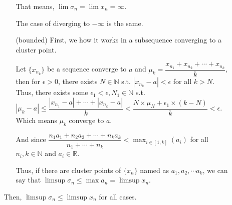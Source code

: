 \documentclass[12pt]{article}
\begin{document}
\begin{enumerate}
\begin{enumerate}[(a)]
\begin{enumerate}
            That means, $\lim \sigma_n = \lim x_n = \infty$.

            The case of diverging to $-\infty$ is the same.

            \item[(bounded)] First, we how it works in a subsequence converging to a cluster point.
            
            Let $\lbrace x_{n_k}\rbrace$ be a sequence converge to $a$ and $\mu_{k} = \dfrac{x_{n_1} + x_{n_2} + \cdots + x_{n_k}}{k}$, then for $\epsilon > 0$, there exists $N\in \mathbb{N}$ s.t. $|x_{n_k} - a| < \epsilon$ for all $k > N$.
            Thus, there exists some $\epsilon_1< \epsilon, N_1\in \mathbb{N}$ s.t. $|\mu_k - a| \leq \dfrac{|x_{n_1} - a| + \cdots + |x_{n_k} - a|}{k} < \dfrac{N\times \mu_N + \epsilon_1\times (k-N)}{k} < \epsilon$.
            Which means $\mu_k$ converge to $a$.

            And since $\dfrac{n_1 a_1 + n_2 a_2 + \cdots + n_k a_k}{n_1 + \cdots + n_k} < \displaystyle\max_{i\in [1, k]}(a_i)$ for all $n_i, k\in \mathbb{N}$ and $a_i \in \mathbb{R}$.

            Thus, if there are cluster points of $\lbrace x_n\rbrace$ named as $a_1, a_2, \cdots a_k$, we can say that $\limsup \sigma_n \leq \max a_n = \limsup x_n$.
        \end{enumerate}
        
        Then, $\limsup \sigma_n \leq \limsup x_n$ for all cases.
    \end{enumerate}
\end{enumerate}
\end{document}
